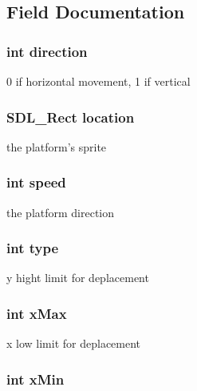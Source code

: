 \subsection{Field Documentation}
\hypertarget{structplatform_a886d551d5381dc3e53f17825ffc51641}{
\subsubsection[{direction}]{\setlength{\rightskip}{0pt plus 5cm}int direction}}\label{structplatform_a886d551d5381dc3e53f17825ffc51641}
0 if horizontal movement, 1 if vertical \hypertarget{structplatform_a08e7ab1c2395b84bea7ca13eb99bac60}{
\subsubsection[{location}]{\setlength{\rightskip}{0pt plus 5cm}S\-D\-L\-\_\-\-Rect location}}\label{structplatform_a08e7ab1c2395b84bea7ca13eb99bac60}
the platform's sprite \hypertarget{structplatform_a218b4f7c6cc2681a99c23a3b089d68b1}{
\subsubsection[{speed}]{\setlength{\rightskip}{0pt plus 5cm}int speed}}\label{structplatform_a218b4f7c6cc2681a99c23a3b089d68b1}
the platform direction \hypertarget{structplatform_ac765329451135abec74c45e1897abf26}{
\subsubsection[{type}]{\setlength{\rightskip}{0pt plus 5cm}int type}}\label{structplatform_ac765329451135abec74c45e1897abf26}
y hight limit for deplacement \hypertarget{structplatform_af201ccbf3fe6a7e8274aa3eca22ac711}{
\subsubsection[{x\-Max}]{\setlength{\rightskip}{0pt plus 5cm}int x\-Max}}\label{structplatform_af201ccbf3fe6a7e8274aa3eca22ac711}
x low limit for deplacement \hypertarget{structplatform_aa91afe2b50db2f2fc786f4caf9f16f69}{
\subsubsection[{x\-Min}]{\setlength{\rightskip}{0pt plus 5cm}int x\-Min}}\label{structplatform_aa91afe2b50db2f2fc786f4caf9f16f69}
